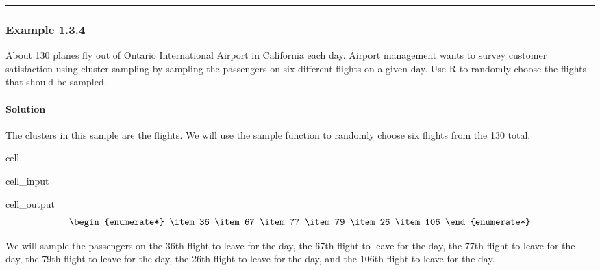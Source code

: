 \documentclass[letterpaper,10pt,english]{jupyterBook}
\begin{document}
\bigskip\hrule\bigskip



\subsubsection{Example 1.3.4}
\label{\detokenize{Ch1 Sampling and Data/1.3 Sampling Techniques:example-1-3-4}}
\sphinxAtStartPar
About 130 planes fly out of Ontario International Airport in California each day. Airport management wants to survey customer satisfaction using cluster sampling by sampling the passengers on six different flights on a given day. Use R to randomly choose the flights that should be sampled.


\paragraph{Solution}
\label{\detokenize{Ch1 Sampling and Data/1.3 Sampling Techniques:id14}}
\sphinxAtStartPar
The clusters in this sample are the flights. We will use the sample function to randomly choose six flights from the 130 total.

\begin{sphinxuseclass}{cell}\begin{sphinxVerbatimInput}

\begin{sphinxuseclass}{cell_input}
\begin{sphinxVerbatim}[commandchars=\\\{\}]
\end{sphinxVerbatim}

\end{sphinxuseclass}\end{sphinxVerbatimInput}
\begin{sphinxVerbatimOutput}

\begin{sphinxuseclass}{cell_output}\begin{equation*}
\begin{split}\begin{enumerate*}
\item 36
\item 67
\item 77
\item 79
\item 26
\item 106
\end{enumerate*}\end{split}
\end{equation*}
\end{sphinxuseclass}\end{sphinxVerbatimOutput}

\end{sphinxuseclass}
\sphinxAtStartPar
We will sample  the passengers on the 36th flight to leave for the day, the 67th flight to leave for the day, the 77th flight to leave for the day, the 79th flight to leave for the day, the 26th flight to leave for the day, and the 106th flight to leave for the day.
\end{document}
